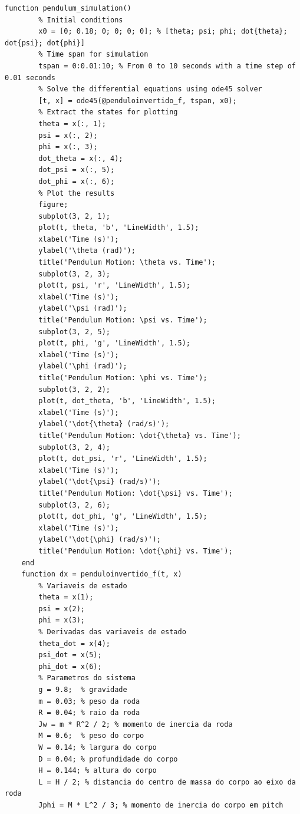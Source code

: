 \documentclass[10pt]{article}
\begin{document}
\begin{appendices}
\begin{lstlisting}[caption={Código da simulação do sistema com ode45}, label=lst:pendulum_sim_r]
    function pendulum_simulation()
        % Initial conditions
        x0 = [0; 0.18; 0; 0; 0; 0]; % [theta; psi; phi; dot{theta}; dot{psi}; dot{phi}]
        % Time span for simulation
        tspan = 0:0.01:10; % From 0 to 10 seconds with a time step of 0.01 seconds
        % Solve the differential equations using ode45 solver
        [t, x] = ode45(@penduloinvertido_f, tspan, x0);
        % Extract the states for plotting
        theta = x(:, 1);
        psi = x(:, 2);
        phi = x(:, 3);
        dot_theta = x(:, 4);
        dot_psi = x(:, 5);
        dot_phi = x(:, 6);
        % Plot the results
        figure;
        subplot(3, 2, 1);
        plot(t, theta, 'b', 'LineWidth', 1.5);
        xlabel('Time (s)');
        ylabel('\theta (rad)');
        title('Pendulum Motion: \theta vs. Time');
        subplot(3, 2, 3);
        plot(t, psi, 'r', 'LineWidth', 1.5);
        xlabel('Time (s)');
        ylabel('\psi (rad)');
        title('Pendulum Motion: \psi vs. Time');
        subplot(3, 2, 5);
        plot(t, phi, 'g', 'LineWidth', 1.5);
        xlabel('Time (s)');
        ylabel('\phi (rad)');
        title('Pendulum Motion: \phi vs. Time');
        subplot(3, 2, 2);
        plot(t, dot_theta, 'b', 'LineWidth', 1.5);
        xlabel('Time (s)');
        ylabel('\dot{\theta} (rad/s)');
        title('Pendulum Motion: \dot{\theta} vs. Time');
        subplot(3, 2, 4);
        plot(t, dot_psi, 'r', 'LineWidth', 1.5);
        xlabel('Time (s)');
        ylabel('\dot{\psi} (rad/s)');
        title('Pendulum Motion: \dot{\psi} vs. Time');
        subplot(3, 2, 6);
        plot(t, dot_phi, 'g', 'LineWidth', 1.5);
        xlabel('Time (s)');
        ylabel('\dot{\phi} (rad/s)');
        title('Pendulum Motion: \dot{\phi} vs. Time');
    end
    function dx = penduloinvertido_f(t, x)
        % Variaveis de estado
        theta = x(1);
        psi = x(2);
        phi = x(3);
        % Derivadas das variaveis de estado
        theta_dot = x(4);
        psi_dot = x(5);
        phi_dot = x(6);
        % Parametros do sistema
        g = 9.8;  % gravidade
        m = 0.03; % peso da roda
        R = 0.04; % raio da roda
        Jw = m * R^2 / 2; % momento de inercia da roda
        M = 0.6;  % peso do corpo
        W = 0.14; % largura do corpo
        D = 0.04; % profundidade do corpo
        H = 0.144; % altura do corpo
        L = H / 2; % distancia do centro de massa do corpo ao eixo da roda
        Jphi = M * L^2 / 3; % momento de inercia do corpo em pitch

\end{lstlisting}
\end{appendices}
\end{document}
